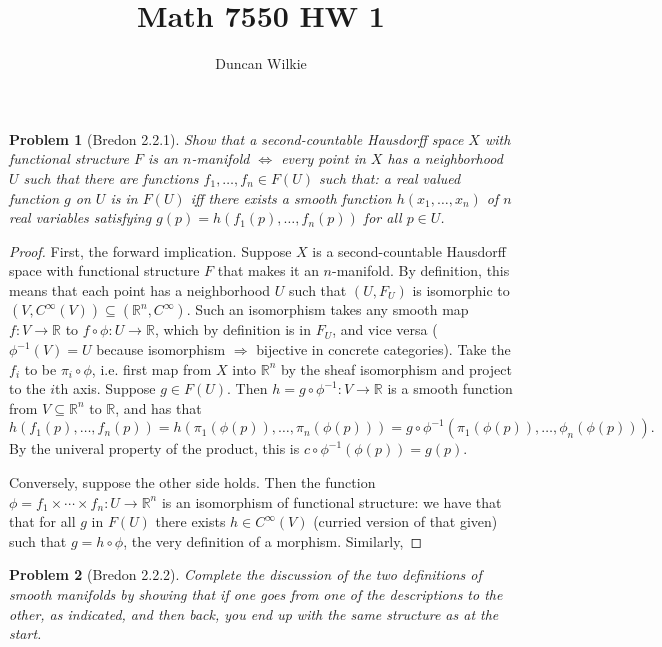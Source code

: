 \documentclass{article}
\title{Math 7550 HW 1}
\author{Duncan Wilkie}
\date{}
\newtheorem{plm}{Problem}
\begin{document}
\maketitle

\begin{plm}[Bredon 2.2.1]
  Show that a second-countable Hausdorff space $X$ with functional structure $F$ is an $n$-manifold
  $\Leftrightarrow$ every point in $X$ has a neighborhood $U$ such that there are functions $f_{1}, \ldots, f_{n} \in F(U)$
  such that: a real valued function $g$ on $U$ is in $F(U)$ iff there exists a smooth function $h(x_{1}, \ldots, x_{n})$
  of $n$ real variables satisfying $g(p) = h(f_{1}(p), \ldots, f_{n}(p))$ for all $p \in U$.
\end{plm}

\begin{proof}
  First, the forward implication.
  Suppose $X$ is a second-countable Hausdorff space with functional structure $F$ that makes it an $n$-manifold.
  By definition, this means that each point has a neighborhood $U$ such that $(U, F_{U})$
  is isomorphic to $(V, C^{\infty}(V)) \subseteq (\mathbb{R}^{n}, C^{\infty})$.
  Such an isomorphism takes any smooth map $f: V \to \mathbb{R}$ to $f \circ \phi: U \to \mathbb{R}$, which by definition is in $F_{U}$,
  and vice versa ($\phi^{-1}(V) = U$ because isomorphism $\Rightarrow$ bijective in concrete categories).
  Take the $f_{i}$ to be $\pi_{i} \circ \phi$, i.e. first map from $X$ into $\mathbb{R}^{n}$ by the sheaf isomorphism and project to the $i$th axis.
  Suppose $g \in F(U)$.
  Then $h = g \circ \phi^{-1}: V \to \mathbb{R}$ is a smooth function from $V \subseteq \mathbb{R}^{n}$ to $\mathbb{R}$,
  and has that
  \[
    h(f_{1}(p), \ldots, f_{n}(p)) = h(\pi_{1}(\phi(p)), \ldots, \pi_{n}(\phi(p))) = g \circ \phi^{-1}(\pi_{1}(\phi(p)), \ldots, \phi_{n}(\phi(p))).
  \]
  By the univeral property of the product, this is $c \circ \phi^{-1}(\phi(p)) = g(p)$.

  Conversely, suppose the other side holds.
  Then the function $\phi = f_{1} \times \cdots \times f_{n}: U \to \mathbb{R}^{n}$ is an isomorphism of functional structure:
  we have that that for all $g$ in $F(U)$ there exists $h \in C^{\infty}(V)$ (curried version of that given) such that $g = h  \circ \phi$,
  the very definition of a morphism.
  Similarly,
\end{proof}


\begin{plm}[Bredon 2.2.2]
  Complete the discussion of the two definitions of smooth manifolds by showing that if one goes from one of the descriptions to the other,
  as indicated, and then back, you end up with the same structure as at the start.
\end{plm}
\end{document}
